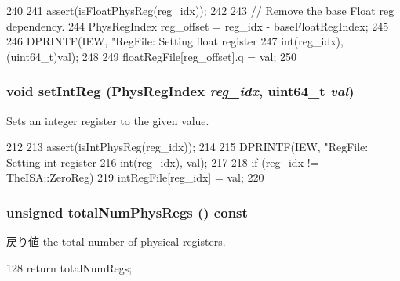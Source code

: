 \begin{DoxyCode}
240     {
241         assert(isFloatPhysReg(reg_idx));
242 
243         // Remove the base Float reg dependency.
244         PhysRegIndex reg_offset = reg_idx - baseFloatRegIndex;
245 
246         DPRINTF(IEW, "RegFile: Setting float register %
247                 int(reg_idx), (uint64_t)val);
248 
249         floatRegFile[reg_offset].q = val;
250     }
\end{DoxyCode}
\hypertarget{classPhysRegFile_a4c51910e7542c198251e8d014077e9c6}{
\subsubsection[{setIntReg}]{\setlength{\rightskip}{0pt plus 5cm}void setIntReg ({\bf PhysRegIndex} {\em reg\_\-idx}, \/  uint64\_\-t {\em val})}}
\label{classPhysRegFile_a4c51910e7542c198251e8d014077e9c6}
Sets an integer register to the given value. 


\begin{DoxyCode}
212     {
213         assert(isIntPhysReg(reg_idx));
214 
215         DPRINTF(IEW, "RegFile: Setting int register %
216                 int(reg_idx), val);
217 
218         if (reg_idx != TheISA::ZeroReg)
219             intRegFile[reg_idx] = val;
220     }
\end{DoxyCode}
\hypertarget{classPhysRegFile_ad16381c6ff3ee42d5456b1d632a52730}{
\subsubsection[{totalNumPhysRegs}]{\setlength{\rightskip}{0pt plus 5cm}unsigned totalNumPhysRegs () const}}
\label{classPhysRegFile_ad16381c6ff3ee42d5456b1d632a52730}
\begin{DoxyReturn}{戻り値}
the total number of physical registers. 
\end{DoxyReturn}



\begin{DoxyCode}
128 { return totalNumRegs; }
\end{DoxyCode}


